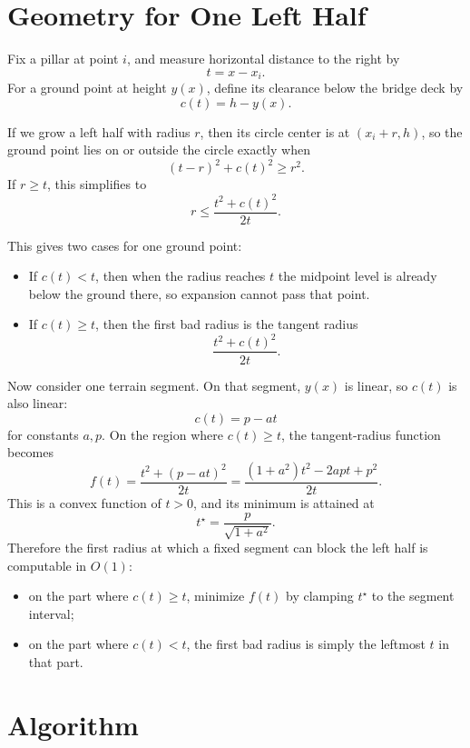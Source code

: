 \documentclass[11pt]{article}
\begin{document}
\section*{Geometry for One Left Half}

Fix a pillar at point $i$, and measure horizontal distance to the right by
\[
t = x - x_i.
\]
For a ground point at height $y(x)$, define its clearance below the bridge deck by
\[
c(t) = h - y(x).
\]

If we grow a left half with radius $r$, then its circle center is at $(x_i + r, h)$, so the ground point lies on or outside the circle exactly when
\[
(t-r)^2 + c(t)^2 \ge r^2.
\]
If $r \ge t$, this simplifies to
\[
r \le \frac{t^2 + c(t)^2}{2t}.
\]

This gives two cases for one ground point:
\begin{itemize}[leftmargin=*]
    \item If $c(t) < t$, then when the radius reaches $t$ the midpoint level is already below the ground there, so expansion cannot pass that point.
    \item If $c(t) \ge t$, then the first bad radius is the tangent radius
    \[
    \frac{t^2 + c(t)^2}{2t}.
    \]
\end{itemize}

Now consider one terrain segment. On that segment, $y(x)$ is linear, so $c(t)$ is also linear:
\[
c(t) = p - at
\]
for constants $a, p$. On the region where $c(t) \ge t$, the tangent-radius function becomes
\[
f(t) = \frac{t^2 + (p-at)^2}{2t}
= \frac{(1+a^2)t^2 - 2apt + p^2}{2t}.
\]
This is a convex function of $t > 0$, and its minimum is attained at
\[
t^\star = \frac{p}{\sqrt{1+a^2}}.
\]
Therefore the first radius at which a fixed segment can block the left half is computable in $O(1)$:
\begin{itemize}[leftmargin=*]
    \item on the part where $c(t) \ge t$, minimize $f(t)$ by clamping $t^\star$ to the segment interval;
    \item on the part where $c(t) < t$, the first bad radius is simply the leftmost $t$ in that part.
\end{itemize}

\section*{Algorithm}
\end{document}

